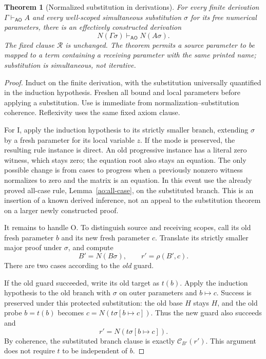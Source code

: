\documentclass[11pt,letterpaper]{article}
\newtheorem{theorem}{Theorem}[section]
\theoremstyle{definition}
\begin{document}
\begin{theorem}[Normalized substitution in derivations]
\label{ao:substitution}
For every finite derivation $\Gamma\vdash_{\mathsf{AO}}A$ and every
well-scoped simultaneous substitution $\sigma$ for its free numerical
parameters, there is an effectively constructed derivation
\[
            N(\Gamma\sigma)\vdash_{\mathsf{AO}}N(A\sigma).
\]
The fixed clause $\mathcal R$ is unchanged.  The theorem permits a source
parameter to be mapped to a term containing a receiving parameter with
the same printed name; substitution is simultaneous, not iterative.
\end{theorem}
\begin{proof}
Induct on the finite derivation, with the substitution universally
quantified in the induction hypothesis.  Freshen all bound and local
parameters before applying a substitution.  Use is immediate from
normalization--substitution coherence.  Reflexivity uses the same fixed
axiom clause.

For I, apply the induction hypothesis to its strictly smaller branch,
extending $\sigma$ by a fresh parameter for its local variable $z$.
If the mode is preserved, the resulting rule instance is direct.  An
old progressive instance has a literal zero witness, which stays zero;
the equation root also stays an equation.  The only possible change is
from cases to progress when a previously nonzero witness normalizes to
zero and the matrix is an equation.  In this event use the already proved
all-case rule, Lemma~\ref{ao:all-case}, on the substituted branch.
This is an insertion of a known derived inference, not an appeal to the
substitution theorem on a larger newly constructed proof.

It remains to handle O.  To distinguish source and receiving scopes,
call its old fresh parameter $b$ and its new fresh parameter $c$.
Translate its strictly smaller major proof under $\sigma$, and compute
\[
  B'=N(B\sigma),\qquad r'=\rho(B',c).
\]
There are two cases according to the \emph{old} guard.

If the old guard succeeded, write its old target as $t(b)$.  Apply the
induction hypothesis to the old branch with $\sigma$ on outer parameters
and $b\mapsto c$.  Success is preserved under this protected substitution:
the old base $H$ stays $H$, and the old probe $b=t(b)$ becomes
$c=N(t\sigma[b\mapsto c])$.  Thus the new guard also succeeds and
\[
 r'=N(t\sigma[b\mapsto c]).
\]
By coherence, the substituted branch clause is exactly
$\mathcal C_{B'}(r')$.  This argument does not require $t$ to be
independent of $b$.


\end{proof}
\end{document}
